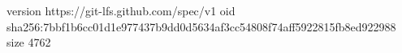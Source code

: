 version https://git-lfs.github.com/spec/v1
oid sha256:7bbf1b6cc01d1e977437b9dd0d5634af3cc54808f74aff5922815fb8ed922988
size 4762
